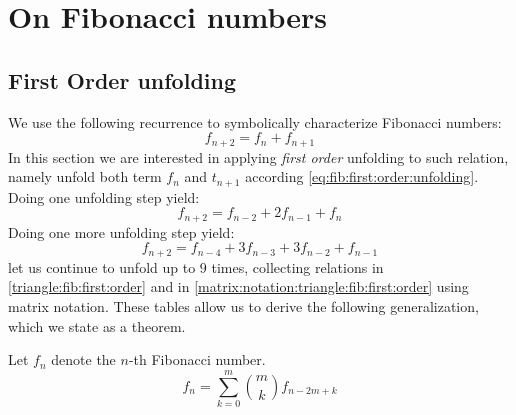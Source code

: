 
\chapter{On Fibonacci numbers}

\section{First Order unfolding}

We use the following recurrence to symbolically characterize Fibonacci numbers: 
\begin{equation}
    \label{eq:fib:first:order:unfolding}
    f_{n + 2} = f_{n} + f_{n + 1}
\end{equation}
In this section we are interested in applying \emph{first order} unfolding
to such relation, namely unfold both term $f_{n}$ and $t_{n+1}$ according
\autoref{eq:fib:first:order:unfolding}. Doing one unfolding step yield:
\begin{displaymath} 
    f_{n + 2} = f_{n - 2} + 2 f_{n - 1} + f_{n}
\end{displaymath}
Doing one more unfolding step yield:
\begin{displaymath} 
    f_{n + 2} = f_{n - 4} + 3 f_{n - 3} + 3 f_{n - 2} + f_{n - 1}
\end{displaymath}
let us continue to unfold up to $9$ times, collecting relations in 
\autoref{triangle:fib:first:order} and in \autoref{matrix:notation:triangle:fib:first:order}
using matrix notation. These tables allow us to derive the 
following generalization, which we state as a theorem.

\begin{thm} Let $f_{n}$ denote the $n$-th Fibonacci number.
    \begin{displaymath} 
        f_{n} = \sum_{k=0}^{m} {{{m}\choose{k}} f_{n - 2 m + k}}
    \end{displaymath} 
\end{thm}



